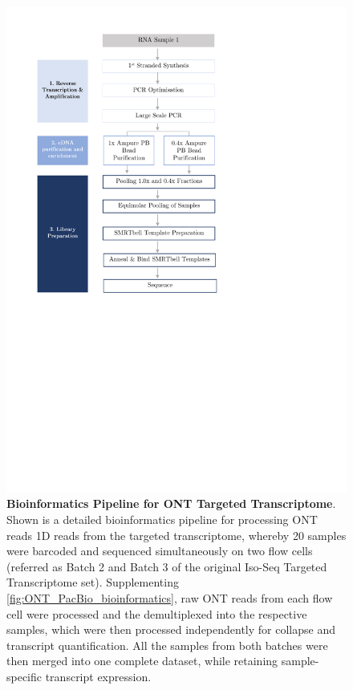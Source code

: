 \begin{figure}[htp]
	\centering
	\includegraphics[page=16,trim={0cm 6cm 0cm 0cm},clip,scale = 0.8]{Figures/ProjectDevelopment_Figures}
	\captionsetup{width=0.95\textwidth,singlelinecheck=off}
	\caption[Bioinformatics Pipeline for ONT Targeted Transcriptome]%
	{\textbf{Bioinformatics Pipeline for ONT Targeted Transcriptome}. Shown is a detailed bioinformatics pipeline for processing ONT reads 1D reads from the targeted transcriptome, whereby 20 samples were barcoded and sequenced simultaneously on two flow cells (referred as Batch 2 and Batch 3 of the original Iso-Seq Targeted Transcriptome set). Supplementing \cref{fig:ONT_PacBio_bioinformatics}, raw ONT reads from each flow cell were processed and the demultiplexed into the respective samples, which were then processed independently for collapse and transcript quantification. All the samples from both batches were then merged into one complete dataset, while retaining sample-specific transcript expression. 
	}
	\label{fig:ONT_Targeted_bioinformatics}
\end{figure}


